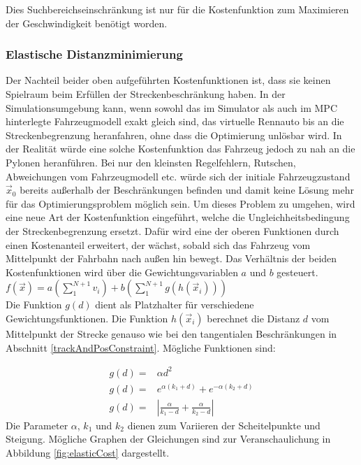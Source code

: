 \documentclass{like}
\begin{document}
Dies Suchbereichseinschränkung ist nur für die Kostenfunktion zum Maximieren der Geschwindigkeit benötigt worden.

\subsubsection*{Elastische Distanzminimierung}
Der Nachteil beider oben aufgeführten Kostenfunktionen ist, dass sie keinen Spielraum beim Erfüllen der Streckenbeschränkung haben. In der Simulationsumgebung kann, wenn sowohl das im Simulator als auch im \ac{MPC} hinterlegte Fahrzeugmodell exakt gleich sind, das virtuelle Rennauto bis an die Streckenbegrenzung heranfahren, ohne dass die Optimierung unlösbar wird. In der Realität würde eine solche Kostenfunktion das Fahrzeug jedoch zu nah an die Pylonen heranführen. Bei nur den kleinsten Regelfehlern, Rutschen, Abweichungen vom Fahrzeugmodell etc. würde sich der initiale Fahrzeugzustand $\vec{x}_0$ bereits außerhalb der Beschränkungen befinden und damit keine Lösung mehr für das Optimierungsproblem möglich sein. Um dieses Problem zu umgehen, wird eine neue Art der Kostenfunktion eingeführt, welche die Ungleichheitsbedingung der Streckenbegrenzung ersetzt. Dafür wird eine der oberen Funktionen durch einen Kostenanteil erweitert, der wächst, sobald sich das Fahrzeug vom Mittelpunkt der Fahrbahn nach außen hin bewegt. Das Verhältnis der beiden Kostenfunktionen wird über die Gewichtungsvariablen \(a\) und \(b\) gesteuert.\\
$f(\vec{x}) = a (\sum_{1}^{N+1} v_i) + b(\sum_{1}^{N+1} g(h(\vec{x}_i)))$  \\
Die Funktion $g(d)$ dient als Platzhalter für verschiedene Gewichtungsfunktionen. Die Funktion $h(\vec{x}_i)$ berechnet die Distanz \(d\) vom Mittelpunkt der Strecke genauso wie bei den tangentialen Beschränkungen in Abschnitt \ref{trackAndPosConstraint}. Mögliche Funktionen sind:

\begin{eqnarray}
	g(d) = &\alpha d^2 \\
	g(d) = &e^{\alpha (k_1 + d)} + e^{-\alpha(k_2 + d)} \label{eq:distMeasure1}\\
	g(d) = &|\frac{\alpha}{k_1-d} + \frac{\alpha}{k_2 - d}| \label{eq:distMeasure2}
\end{eqnarray}
Die Parameter $\alpha$, $k_1$ und $k_2$ dienen zum Variieren der Scheitelpunkte und Steigung.
Mögliche Graphen der Gleichungen sind zur Veranschaulichung in Abbildung \ref{fig:elasticCost} dargestellt.
\end{document}
